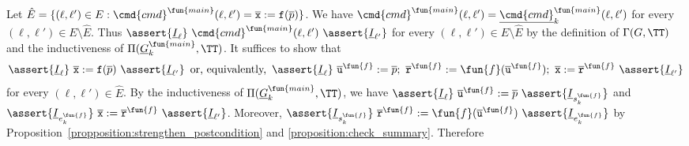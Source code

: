 Let $\hat{E} = \{ (\ell, \ell') \in E : \cmd{cmd}^\fun{main} (\ell, \ell') =
\overline{\mathtt{x}} := \mathtt{f} (\overline{p}) \}$. We have
$\cmd{cmd}^\fun{main} (\ell, \ell') = \underline{\cmd{cmd}}_k^\fun{main} (\ell, \ell')$ for every
$(\ell, \ell') \in E \setminus \hat{E}$. Thus $\assert{\underline{I}_{\ell}}\
\cmd{cmd}^\fun{main} (\ell, \ell')\ \assert{\underline{I}_{\ell'}}$ for every $(\ell,
\ell') \in E \setminus \hat{E}$ by the definition of $\Gamma (G,
\TT)$ and the inductiveness of $\Pi (\underline{G}^{\fun{main}}_k,
\TT)$. It suffices to show that
\begin{equation*}
  \assert{\underline{I}_{\ell}}\
  \overline{\mathtt{x}} := \mathtt{f} (\overline{p})
  \ \assert{\underline{I}_{\ell'}}
  \hspace{0.5em}
  \text{or, equivalently,}
  \hspace{0.5em}
  \assert{\underline{I}_{\ell}}\ 
  \overline{\mathtt{u}}^\fun{f} := \overline{p};\
  \mathtt{\overline{r}}^\fun{f} := \fun{f} (\overline{\mathtt{u}}^\fun{f});\
  \overline{\mathtt{x}} := \mathtt{\overline{r}}^\fun{f}
  \ \assert{\underline{I}_{\ell'}}
\end{equation*}
for every $(\ell, \ell') \in \hat{E}$. 
By the inductiveness of $\Pi (\underline{G}^{\fun{main}}_k, \TT)$, we have
$\assert{\underline{I}_{\ell}}\ \overline{\mathtt{u}}^\fun{f} := \overline{p}\
\assert{\underline{I}_{s_k^\fun{f}}}$ and
$\assert{\underline{I}_{e_k^\fun{f}}}\ \overline{\mathtt{x}} :=
\mathtt{\overline{r}}^\fun{f}\ \assert{\underline{I}_{\ell'}}$.
Moreover,
$\assert{\underline{I}_{s_k^\fun{f}}}\
\mathtt{\overline{r}}^\fun{f} := \fun{f}
(\overline{\mathtt{u}}^\fun{f})\ \assert{\underline{I}_{e_k^\fun{f}}}$
by Proposition~\ref{propposition:strengthen_postcondition} and \ref{proposition:check_summary}.
Therefore
\begin{prooftree}



\end{prooftree}
